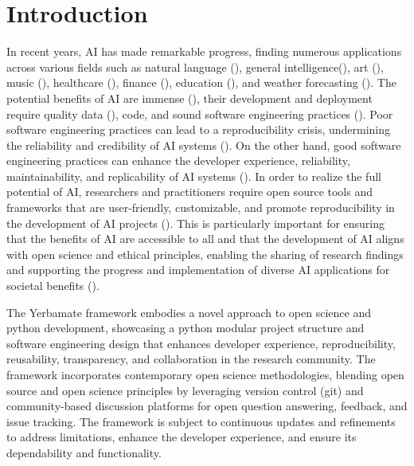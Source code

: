 
\section{Introduction}


 In recent years, AI has made remarkable progress, finding numerous applications across various fields such as natural language (\cite{gpt}), general intelligence(\cite{gato}), art (\cite{diffusion}), music (\cite{musiclm}), healthcare (\cite{aihealthcare}), finance (\cite{bao2022fraudartificial}), education (\cite{aieducation}), and weather forecasting (\cite{weather}). The potential benefits of AI are immense (\cite{beneficialai,potencialaibenefit}), their development and deployment require quality data (\cite{lecun2015deep}), code, and sound software engineering practices (\cite{se4dl,amershi2019software}). Poor software engineering practices can lead to a reproducibility crisis, undermining the reliability and credibility of AI systems (\cite{leakage-recrisis}). On the other hand, good software engineering practices can enhance the developer experience, reliability, maintainability, and replicability of AI systems (\cite{se4dl,amershi2019software, wan2019does}). In order to realize the full potential of AI, researchers and practitioners require open source tools and frameworks that are user-friendly, customizable, and promote reproducibility in the development of AI projects (\cite{lu2022softwareAIReponse,li2018can,wolf2020designing,olson2018system,ong2021guide,gundersen2018reproducible}). This is particularly important for ensuring that the benefits of AI are accessible to all and that the development of AI aligns with open science and ethical principles, enabling the sharing of research findings and supporting the progress and implementation of diverse AI applications for societal benefits (\cite{coro2020open,braun2018open, mittelstadt2016ethics,floridi2018ai4people,ong2021guide}).

The Yerbamate framework embodies a novel approach to open science and python development, showcasing a python modular project structure and software engineering design that enhances developer experience, reproducibility, reusability, transparency, and collaboration in the research community. The framework incorporates contemporary open science methodologies, blending open source and open science principles by leveraging version control (git) and community-based discussion platforms for open question answering, feedback, and issue tracking. The framework is subject to continuous updates and refinements to address limitations, enhance the developer experience, and ensure its dependability and functionality. 


